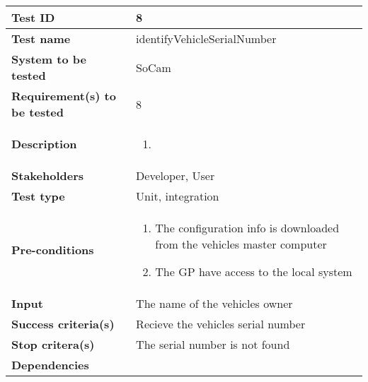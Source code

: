 \begin{table}[H]
			\begin{tabular}{| p{4cm} | p{10cm} |}
			\hline
			\rowcolor{gray}
				{\bf Test ID} & 8 \\ \hline
				{\bf Test name} & identifyVehicleSerialNumber \\ \hline
				{\bf System to be tested} & SoCam \\ \hline
				{\bf Requirement(s) to be tested} & 8 \\ \hline
				{\bf Description} & 
					\begin{enumerate}
						\item
					\end{enumerate}
				\\ \hline
				{\bf Stakeholders} & Developer, User \\ \hline
				{\bf Test type} & Unit, integration \\ \hline
				{\bf Pre-conditions} & 
					\begin{enumerate}
						\item The configuration info is downloaded from the 
						vehicles master computer
						\item The GP have access to the local system
					\end{enumerate} \\ \hline
				{\bf Input} & The name of the vehicles owner \\ \hline
				{\bf Success criteria(s)} & Recieve the vehicles serial number \\ \hline
				{\bf Stop critera(s)} &  The serial number is not found \\ \hline
				{\bf Dependencies} & \\ \hline
			\end{tabular}
		\end{table}

